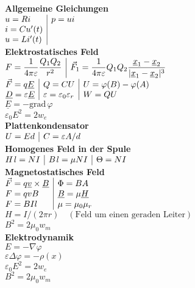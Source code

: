 \documentclass[a4paper,10pt,fleqn,twoside,twocolumn,dvipdfmx]{scrartcl}
\newcommand{\strong}[1]{\textsf{\textbf{#1}}}
\newcommand{\ds}{\displaystyle}
\begin{document}
\strong{Allgemeine Gleichungen}\\
$\begin{array}{@{}l|l}
u = Ri & p=ui\\
i = Cu'(t)\\
u = Li'(t)
\end{array}$\\[4pt]
\strong{Elektrostatisches Feld}\\[2pt]
$\begin{array}{@{}l|l}
\ds F=\frac{1}{4\pi\varepsilon}\frac{Q_1Q_2}{r^2}
&\ds\vec F_1 = \frac{1}{4\pi\varepsilon}
Q_1Q_2\frac{\underline x_1-\underline x_2}
{|\underline x_1-\underline x_2|^3}
\end{array}$\\
$\begin{array}{@{}l|l|l}
\vec F = q\underline E & Q=CU
&U = \varphi(B)-\varphi(A)\\
\underline D = \varepsilon \underline E
&\varepsilon = \varepsilon_0\varepsilon_r
& W=QU
\end{array}$\\
$\underline E = -\mathrm{grad}\,\varphi$\\
$\varepsilon_0 E^2 = 2w_e$\\[4pt]
\strong{Plattenkondensator}\\
$\begin{array}{@{}l|l}
U=Ed & C=\varepsilon A/d
\end{array}$\\[4pt]
\strong{Homogenes Feld in der Spule}\\
$\begin{array}{@{}l|l|l}
H\;\!l = NI & B\;\!l = \mu NI & \Theta = NI
\end{array}$\\[4pt]
\strong{Magnetostatisches Feld}\\
$\begin{array}{@{}l|l}
\vec F = q\underline v\times\underline B
& \Phi = BA\\
F = qvB & \underline B = \mu\underline H\\
F = BIl & \mu = \mu_0\mu_r
\end{array}$\\
$H = I/(2\pi r)\quad (\text{Feld um einen geraden Leiter})$\\
$B^2 = 2\mu_0 w_m$\\[4pt]
\strong{Elektrodynamik}\\[2pt]
$E=-\nabla\varphi$\\
$\varepsilon\Delta\varphi = -\rho(x)$\\
$\varepsilon_0 E^2 = 2w_e$\\
$B^2 = 2\mu_0 w_m$
\end{document}
